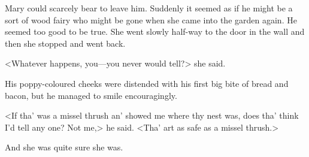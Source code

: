 Mary could scarcely bear to leave him. Suddenly it seemed as if he might be a sort of wood fairy who might be gone when she came into the garden again. He seemed too good to be true. She went slowly half-way to the door in the wall and then she stopped and went back.

<Whatever happens, you—you never would tell?> she said.

His poppy-coloured cheeks were distended with his first big bite of bread and bacon, but he managed to smile encouragingly.

<If tha' was a missel thrush an' showed me where thy nest was, does tha' think I'd tell any one? Not me,> he said. <Tha' art as safe as a missel thrush.>

And she was quite sure she was.